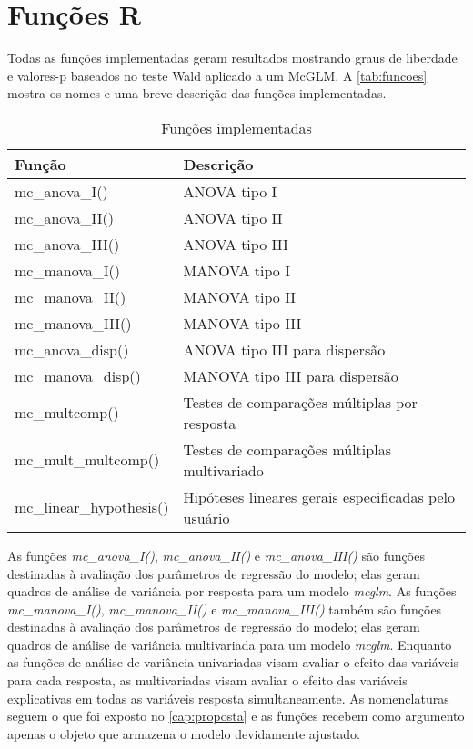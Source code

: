 
\section{Funções R}

Todas as funções implementadas geram resultados mostrando graus de liberdade e valores-p baseados no teste Wald aplicado a um McGLM. A \autoref{tab:funcoes} mostra os nomes e uma breve descrição das funções implementadas.

\begin{table}[h]
\centering
\begin{tabular}{ll}
\hline
Função                   & Descrição \\ 
\hline

mc\_anova\_I()           & ANOVA  tipo I \\
mc\_anova\_II()          & ANOVA  tipo II \\
mc\_anova\_III()         & ANOVA  tipo III \\

mc\_manova\_I()          & MANOVA tipo I \\
mc\_manova\_II()         & MANOVA tipo II \\
mc\_manova\_III()        & MANOVA tipo III \\

mc\_anova\_disp()        & ANOVA  tipo III para dispersão \\
mc\_manova\_disp()       & MANOVA tipo III para dispersão \\

mc\_multcomp()           & Testes de comparações múltiplas por resposta \\

mc\_mult\_multcomp()     & Testes de comparações múltiplas multivariado \\

mc\_linear\_hypothesis() & Hipóteses lineares gerais especificadas pelo usuário \\

\hline
\end{tabular}
\caption{Funções implementadas}
\label{tab:funcoes}
\end{table}

As funções \emph{mc\_anova\_I()}, \emph{mc\_anova\_II()} e \emph{mc\_anova\_III()} são funções destinadas à avaliação dos parâmetros de regressão do modelo; elas geram quadros de análise de variância por resposta para um modelo \emph{mcglm}. As funções \emph{mc\_manova\_I()}, \emph{mc\_manova\_II()} e \emph{mc\_manova\_III()} também são funções destinadas à avaliação dos parâmetros de regressão do modelo; elas geram quadros de análise de variância multivariada para um modelo \emph{mcglm}. Enquanto as funções de análise de variância univariadas visam avaliar o efeito das variáveis para cada resposta, as multivariadas visam avaliar o efeito das variáveis explicativas em todas as variáveis resposta simultaneamente. As nomenclaturas seguem o que foi exposto no \autoref{cap:proposta} e as funções recebem como argumento apenas o objeto que armazena o modelo devidamente ajustado.

